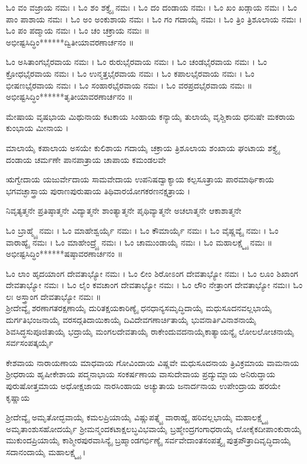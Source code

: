 ಓಂ ವಂ ವಜ್ರಾಯ ನಮಃ । ಓಂ ಶಂ ಶಕ್ತ್ಯೈ ನಮಃ । ಓಂ ದಂ ದಂಡಾಯ ನಮಃ । ಓಂ ಖಂ ಖಡ್ಗಾಯ ನಮಃ । ಓಂ ಪಾಂ ಪಾಶಾಯ ನಮಃ । ಓಂ ಅಂ ಅಂಕುಶಾಯ ನಮಃ । ಓಂ ಗಂ ಗದಾಯೈ ನಮಃ । ಓಂ  ತ್ರಿಂ  ತ್ರಿಶೂಲಾಯ ನಮಃ । ಓಂ ಪಂ ಪದ್ಮಾಯ ನಮಃ । ಓಂ ಚಂ ಚಕ್ರಾಯ ನಮಃ ॥\\
ಅಭೀಷ್ಟಸಿದ್ಧಿಂ******ದ್ವಿತೀಯಾವರಣಾರ್ಚನಂ ॥

ಓಂ ಅಸಿತಾಂಗಭೈರವಾಯ ನಮಃ । ಓಂ ರುರುಭೈರವಾಯ ನಮಃ । ಓಂ ಚಂಡಭೈರವಾಯ ನಮಃ । ಓಂ ಕ್ರೋಧಭೈರವಾಯ ನಮಃ । ಓಂ ಉನ್ಮತ್ತಭೈರವಾಯ ನಮಃ । ಓಂ ಕಪಾಲಭೈರವಾಯ ನಮಃ । ಓಂ ಭೀಷಣಭೈರವಾಯ ನಮಃ । ಓಂ ಸಂಹಾರಭೈರವಾಯ ನಮಃ । ಓಂ ವರಪ್ರದಭೈರವಾಯ ನಮಃ ॥\\
ಅಭೀಷ್ಟಸಿದ್ಧಿಂ******ತೃತೀಯಾವರಣಾರ್ಚನಂ ॥

ಮೇಷಾಯ ವೃಷಭಾಯ ಮಿಥುನಾಯ ಕಟಕಾಯ ಸಿಂಹಾಯ ಕನ್ಯಾಯೈ ತುಲಾಯೈ ವೃಶ್ಚಿಕಾಯ ಧನುಷೇ ಮಕರಾಯ ಕುಂಭಾಯ ಮೀನಾಯ ।

ಮಾಲಾಯೈ ಕಪಾಲಾಯ ಅಸಯೇ ಕುಲಿಶಾಯ ಗದಾಯೈ ಚಕ್ರಾಯ ತ್ರಿಶೂಲಾಯ ಶಂಖಾಯ ಘಂಟಾಯ ಶಕ್ತ್ಯೈ ದಂಡಾಯ ಚರ್ಮಣೇ ಪಾನಪಾತ್ರಾಯ ಚಾಪಾಯ ಕಮಂಡಲವೇ

ಋಗ್ವೇದಾಯ ಯಜುರ್ವೇದಾಯ ಸಾಮವೇದಾಯ ಉಪನಿಷದ್ವಾಕ್ಯಾಯ ಕಲ್ಪಸೂತ್ರಾಯ ಪಾರಮಾರ್ಥಿಕಾಯ ಭಗವಚ್ಛಾಸ್ತ್ರಾಯ ಪುರಾಣಪುರುಷಾಯ ತಿಥಿವಾರಯೋಗಕರಣನಕ್ಷತ್ರಾಯ ।

ನಿವೃತ್ಯತ್ಮನೇ ಪ್ರತಿಷ್ಠಾತ್ಮನೇ ವಿದ್ಯಾತ್ಮನೇ ಶಾಂತ್ಯಾತ್ಮನೇ ಪೃಥಿವ್ಯಾತ್ಮನೇ ಅಚಲಾತ್ಮನೇ ಆಕಾಶಾತ್ಮನೇ 

ಓಂ ಬ್ರಾಹ್ಮ್ಯೈ ನಮಃ । ಓಂ ಮಾಹೇಶ್ವರ್ಯೈ ನಮಃ । ಓಂ ಕೌಮಾರ್ಯೈ ನಮಃ । ಓಂ ವೈಷ್ಣವ್ಯೈ ನಮಃ । ಓಂ ವಾರಾಹ್ಯೈ ನಮಃ । ಓಂ ಮಾಹೇಂದ್ರ್ಯೈ ನಮಃ । ಓಂ ಚಾಮುಂಡಾಯೈ ನಮಃ । ಓಂ ಮಹಾಲಕ್ಷ್ಮ್ಯೈ ನಮಃ ॥\\
ಅಭೀಷ್ಟಸಿದ್ಧಿಂ******ಷಷ್ಠಾವರಣಾರ್ಚನಂ ॥


ಓಂ ಲಾಂ ಹೃದಯಾಂಗ ದೇವತಾಭ್ಯೋ ನಮಃ । ಓಂ ಲೀಂ ಶಿರೋಽಂಗ ದೇವತಾಭ್ಯೋ ನಮಃ । ಓಂ ಲೂಂ ಶಿಖಾಂಗ ದೇವತಾಭ್ಯೋ ನಮಃ । ಓಂ ಲೈಂ ಕವಚಾಂಗ ದೇವತಾಭ್ಯೋ ನಮಃ । ಓಂ ಲೌಂ ನೇತ್ರಾಂಗ ದೇವತಾಭ್ಯೋ ನಮಃ। ಓಂ ಲಃ ಅಸ್ತ್ರಾಂಗ ದೇವತಾಭ್ಯೋ ನಮಃ ॥\\

ಶ್ರೀದೇವ್ಯೈ ಶರಣಾಗತರಕ್ಷಣಾಯೈ ದುರಿತಕ್ಷಯಕಾರಿಣ್ಯೈ ಧನಧಾನ್ಯಸಮೃದ್ಧಿದಾಯೈ ಮಧುಸೂದನವಲ್ಲಭಾಯೈ ದುರ್ಗತಿಭಂಜನಾಯೈ ವರಸದ್ಗತಿದಾಯಿಕಾಯೈ ದಿವಿದೇವಗಣಾರ್ಚಿತಾಯೈ ಭುವನಾರ್ತಿವಿನಾಶನಾಯೈ ಶಿವಸಿದ್ಧಸುಪೂಜಿತಾಯೈ ಭದ್ರಾಯೈ ಮಂಗಲದೇವತಾಯೈ ರಾಕೇಂದುವದನಾಯೈಕಾತ್ಯಾಯನ್ಯೈ ಲೋಲಲೋಚನಾಯೈ ಸರ್ವಸಂಪತ್ಕರ್ಯೈ

ಕೇಶವಾಯ ನಾರಾಯಣಾಯ ಮಾಧವಾಯ ಗೋವಿಂದಾಯ ವಿಷ್ಣವೇ ಮಧುಸೂದನಾಯ ತ್ರಿವಿಕ್ರಮಾಯ ವಾಮನಾಯ ಶ್ರೀಧರಾಯ ಹೃಷೀಕೇಶಾಯ ಪದ್ಮನಾಭಾಯ ಸಂಕರ್ಷಣಾಯ ವಾಸುದೇವಾಯ ಪ್ರದ್ಯುಮ್ನಾಯ ಅನಿರುದ್ಧಾಯ ಪುರುಷೋತ್ತಮಾಯ ಅಧೋಕ್ಷಜಾಯ  ನಾರಸಿಂಹಾಯ ಅಚ್ಯುತಾಯ ಜನಾರ್ದನಾಯ ಉಪೇಂದ್ರಾಯ ಹರಯೇ ಕೃಷ್ಣಾಯ 


ಶ್ರೀದೇವ್ಯೈ ಅಮೃತೋದ್ಭವಾಯೈ ಕಮಲಪ್ರಿಯಾಯೈ ವಿಷ್ಣುಪತ್ನ್ಯೈ ವಾರಾಹ್ಯೈ ಹರಿವಲ್ಲಭಾಯೈ ಮಹಾಲಕ್ಷ್ಮ್ಯೈ ಅಮೃತಾಂಶುಸಹೋದರ್ಯೈ ಶ್ರೀಮನ್ಮಂದಕಟಾಕ್ಷಲಬ್ಧವಿಭವಾಯೈ ಬ್ರಹ್ಮೇಂದ್ರಗಂಗಾಧರಾಯೈ ಲೋಕೈಕದೀಪಾಂಕುರಾಯೈ ಮುಕುಂದಪ್ರಿಯಾಯೈ ಕಾಶ್ಮೀರಪುರವಾಸಿನ್ಯೈ ಬ್ರಹ್ಮಾಂಡಗರ್ಭಿಣ್ಯೈ ಸರ್ವವೇದಾಂತಸಂಪತ್ತ್ಯೈ ಪುತ್ರಪೌತ್ರಾದಿವೃದ್ಧಿದಾಯೈ ಸದಾನಂದಾಯೈ ಮಹಾಲಕ್ಷ್ಮ್ಯೈ ।



